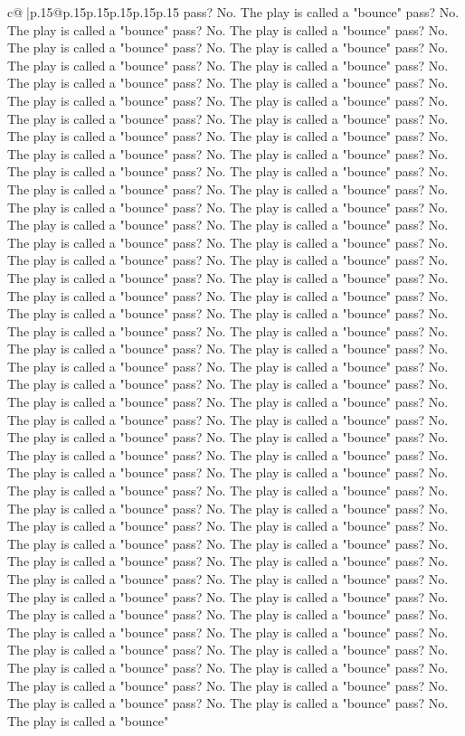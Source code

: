 \documentclass{article}
\begin{document}
{\begin{supertabular}{c@{$\;$}|p{.15\linewidth}@{}p{.15\linewidth}p{.15\linewidth}p{.15\linewidth}p{.15\linewidth}p{.15\linewidth}}
{{{pass? No. The play is called a "bounce" pass? No. The play is called a "bounce" pass? No. The play is called a "bounce" pass? No. The play is called a "bounce" pass? No. The play is called a "bounce" pass? No. The play is called a "bounce" pass? No. The play is called a "bounce" pass? No. The play is called a "bounce" pass? No. The play is called a "bounce" pass? No. The play is called a "bounce" pass? No. The play is called a "bounce" pass? No. The play is called a "bounce" pass? No. The play is called a "bounce" pass? No. The play is called a "bounce" pass? No. The play is called a "bounce" pass? No. The play is called a "bounce" pass? No. The play is called a "bounce" pass? No. The play is called a "bounce" pass? No. The play is called a "bounce" pass? No. The play is called a "bounce" pass? No. The play is called a "bounce" pass? No. The play is called a "bounce" pass? No. The play is called a "bounce" pass? No. The play is called a "bounce" pass? No. The play is called a "bounce" pass? No. The play is called a "bounce" pass? No. The play is called a "bounce" pass? No. The play is called a "bounce" pass? No. The play is called a "bounce" pass? No. The play is called a "bounce" pass? No. The play is called a "bounce" pass? No. The play is called a "bounce" pass? No. The play is called a "bounce" pass? No. The play is called a "bounce" pass? No. The play is called a "bounce" pass? No. The play is called a "bounce" pass? No. The play is called a "bounce" pass? No. The play is called a "bounce" pass? No. The play is called a "bounce" pass? No. The play is called a "bounce" pass? No. The play is called a "bounce" pass? No. The play is called a "bounce" pass? No. The play is called a "bounce" pass? No. The play is called a "bounce" pass? No. The play is called a "bounce" pass? No. The play is called a "bounce" pass? No. The play is called a "bounce" pass? No. The play is called a "bounce" pass? No. The play is called a "bounce" pass? No. The play is called a "bounce" pass? No. The play is called a "bounce" pass? No. The play is called a "bounce" pass? No. The play is called a "bounce" pass? No. The play is called a "bounce" pass? No. The play is called a "bounce" pass? No. The play is called a "bounce" pass? No. The play is called a "bounce" pass? No. The play is called a "bounce" pass? No. The play is called a "bounce" pass? No. The play is called a "bounce" pass? No. The play is called a "bounce" pass? No. The play is called a "bounce" pass? No. The play is called a "bounce" pass? No. The play is called a "bounce" pass? No. The play is called a "bounce" pass? No. The play is called a "bounce" pass? No. The play is called a "bounce" pass? No. The play is called a "bounce" pass? No. The play is called a "bounce" pass? No. The play is called a "bounce" pass? No. The play is called a "bounce" pass? No. The play is called a "bounce" pass? No. The play is called a "bounce" pass? No. The play is called a "bounce" pass? No. The play is called a "bounce" pass? No. The play is called a "bounce" pass? No. The play is called a "bounce" pass? No. The play is called a "bounce" pass? No. The play is called a "bounce" pass? No. The play is called a "bounce" }}}
\end{supertabular}}
\end{document}
